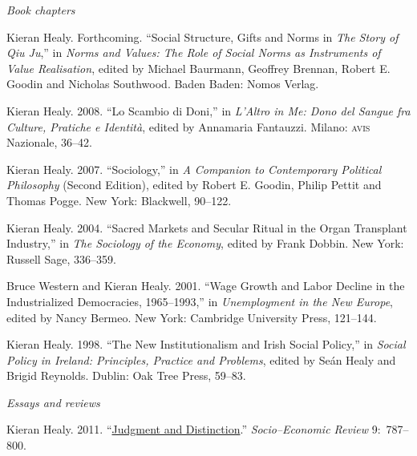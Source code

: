 \documentclass[11pt,oneside,a4paper,DIV=8]{scrartcl}
\renewcommand*{\subsection}[1]{\textit{#1}}
\begin{document}


\subsection{Book chapters}

Kieran Healy. Forthcoming. ``Social Structure, Gifts and Norms in \emph{The Story of Qiu Ju},'' in \emph{Norms and Values: The Role of Social Norms as Instruments of Value Realisation}, edited by Michael Baurmann, Geoffrey Brennan, Robert E. Goodin and Nicholas Southwood. Baden Baden: Nomos Verlag.

Kieran Healy. 2008. ``Lo Scambio di Doni,'' in \emph{L'Altro in Me: Dono del Sangue fra Culture, Pratiche e Identità}, edited by Annamaria Fantauzzi. Milano: \textsc{avis} Nazionale, 36--42. 

Kieran Healy. 2007. ``Sociology,'' in \emph{A Companion to Contemporary Political Philosophy} (Second Edition), edited by Robert E. Goodin, Philip Pettit and Thomas Pogge. New York: Blackwell, 90--122. 

Kieran Healy. 2004. ``Sacred Markets and Secular Ritual in the Organ Transplant
Industry,'' in \emph{The Sociology of the Economy}, edited by Frank Dobbin. New
York: Russell Sage, 336--359.

Bruce Western and Kieran Healy.  2001.  ``Wage Growth and Labor Decline in the
Industrialized Democracies, 1965--1993,'' in \emph{Unemployment in the New
  Europe}, edited by Nancy Bermeo. New York: Cambridge University Press,
121--144.

 Kieran Healy. 1998. ``The New Institutionalism and Irish Social Policy,'' in
\emph{Social Policy in Ireland: Principles, Practice and Problems}, edited by
Se\'{a}n Healy and Brigid Reynolds. Dublin: Oak Tree Press, 59--83.



 

\noindent\emph{Essays and reviews}


Kieran Healy. 2011. ``\href{http://www.kieranhealy.org/files/reviews/karpik-review.pdf}{Judgment and Distinction}.'' \emph{Socio--Economic Review} 9:~787--800. 
\end{document}
